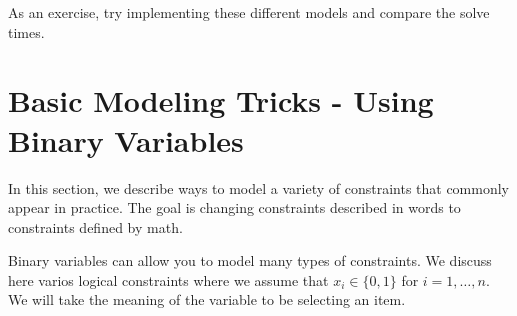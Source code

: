 As an exercise, try implementing these different models and compare the solve times.

\newpage
\section{Basic Modeling Tricks - Using Binary Variables}
In this section, we describe ways to model a variety of constraints that commonly appear in practice.  The goal is changing constraints described in words to constraints defined by math.

Binary variables can allow you to model many types of constraints.  We discuss here varios logical constraints where we assume that $x_i \in \{0,1\}$ for $i=1, \dots, n$.  We will take the meaning of the variable to be selecting an item.

